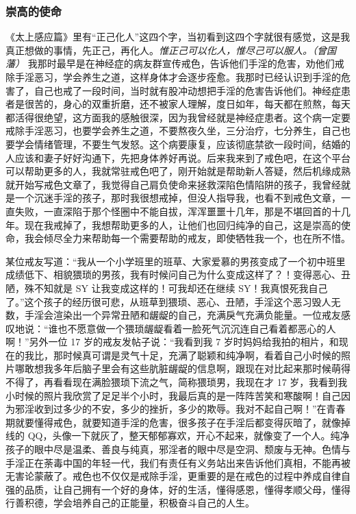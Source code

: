 \subsubsection{崇高的使命}

《太上感应篇》里有“正己化人”这四个字，当初看到这四个字就很有感觉，这是我真正想做的事情，先正己，再化人。\textit{惟正己可以化人，惟尽己可以服人。（曾国藩）} 我那时最早是在神经症的病友群宣传戒色，告诉他们手淫的危害，劝他们戒除手淫恶习，学会养生之道，这样身体才会逐步痊愈。我那时已经认识到手淫的危害了，自己也戒了一段时间，当时就有股冲动想把手淫的危害告诉他们。神经症患者是很苦的，身心的双重折磨，还不被家人理解，度日如年，每天都在煎熬，每天都活得很绝望，这方面我的感触很深，因为我曾经就是神经症患者。这个病一定要戒除手淫恶习，也要学会养生之道，不要熬夜久坐，三分治疗，七分养生，自己也要学会情绪管理，不要生气发怒。这个病要康复，应该彻底禁欲一段时间，结婚的人应该和妻子好好沟通下，先把身体养好再说。后来我来到了戒色吧，在这个平台可以帮助更多的人，我就常驻戒色吧了，刚开始就是帮助新人答疑，然后机缘成熟就开始写戒色文章了，我觉得自己肩负使命来拯救深陷色情陷阱的孩子，我曾经就是一个沉迷手淫的孩子，那时我很想戒掉，但没人指导我，也看不到戒色文章，一直失败，一直深陷于那个怪圈中不能自拔，浑浑噩噩十几年，那是不堪回首的十几年。现在我戒掉了，我想帮助更多的人，让他们也回归纯净的自己，这是崇高的使命，我会倾尽全力来帮助每一个需要帮助的戒友，即使牺牲我一个，也在所不惜。

某位戒友写道：“我从一个小学班里的班草、大家爱慕的男孩变成了一个初中班里成绩低下、相貌猥琐的男孩，我有时候问自己为什么变成这样了？！变得恶心、丑陋，殊不知就是 SY 让我变成这样的！可我却还在继续 SY！我真恨死我自己了。”这个孩子的经历很可悲，从班草到猥琐、恶心、丑陋，手淫这个恶习毁人无数，手淫会渲染出一个异常丑陋和龌龊的自己，充满戾气充满负能量。一位戒友感叹地说：“谁也不愿意做一个猥琐龌龊看着一脸死气沉沉连自己看着都恶心的人啊！”另外一位 17 岁的戒友发帖子说：“我看到我 7 岁时妈妈给我拍的相片，和现在的我比，那时候真可谓是灵气十足，充满了聪颖和纯净啊，看着自己小时候的照片哪敢想我多年后脑子里会有这些肮脏龌龊的信息啊，跟现在对比起来那时候萌得不得了，再看看现在满脸猥琐下流之气，简称猥琐男，我现在才 17 岁，我看到我小时候的照片我欣赏了足足半个小时，我最后真的是一阵阵苦笑和寒酸啊！自己因为邪淫收到过多少的不安，多少的挫折，多少的欺辱。我对不起自己啊！”在青春期就要懂得戒色，就要知道手淫的危害，很多孩子在手淫后都变得灰暗了，就像掉线的 QQ，头像一下就灰了，整天郁郁寡欢，开心不起来，就像变了一个人。纯净孩子的眼中尽是温柔、善良与纯真，邪淫者的眼中尽是空洞、颓废与无神。色情与手淫正在荼毒中国的年轻一代，我们有责任有义务站出来告诉他们真相，不能再被无害论蒙蔽了。戒色也不仅仅是戒除手淫，更重要的是在戒色的过程中养成自律自强的品质，让自己拥有一个好的身体，好的生活，懂得感恩，懂得孝顺父母，懂得行善积德，学会培养自己的正能量，积极奋斗自己的人生。

